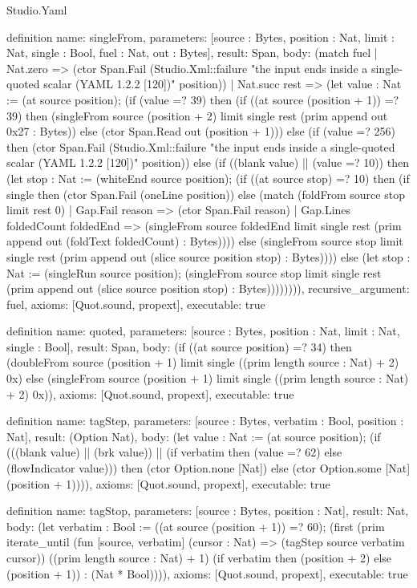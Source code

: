 \begin{lexlean}{Studio.Yaml}
\begin{semanticmodule}
definition{
  name: singleFrom,
  parameters: [source : Bytes, position : Nat, limit : Nat, single : Bool, fuel : Nat, out : Bytes],
  result: Span,
  body: (match fuel
    | Nat.zero => (ctor Span.Fail (Studio.Xml::failure "the input ends inside a single-quoted scalar (YAML 1.2.2 [120])" position))
    | Nat.succ rest => (let value : Nat := (at source position); (if (value =? 39) then (if ((at source (position + 1)) =? 39) then (singleFrom source (position + 2) limit single rest (prim append out 0x27 : Bytes)) else (ctor Span.Read out (position + 1))) else (if (value =? 256) then (ctor Span.Fail (Studio.Xml::failure "the input ends inside a single-quoted scalar (YAML 1.2.2 [120])" position)) else (if ((blank value) || (value =? 10)) then (let stop : Nat := (whiteEnd source position); (if ((at source stop) =? 10) then (if single then (ctor Span.Fail (oneLine position)) else (match (foldFrom source stop limit rest 0)
      | Gap.Fail reason => (ctor Span.Fail reason)
      | Gap.Lines foldedCount foldedEnd => (singleFrom source foldedEnd limit single rest (prim append out (foldText foldedCount) : Bytes)))) else (singleFrom source stop limit single rest (prim append out (slice source position stop) : Bytes)))) else (let stop : Nat := (singleRun source position); (singleFrom source stop limit single rest (prim append out (slice source position stop) : Bytes)))))))),
  recursive_argument: fuel,
  axioms: [Quot.sound, propext],
  executable: true
}

definition{
  name: quoted,
  parameters: [source : Bytes, position : Nat, limit : Nat, single : Bool],
  result: Span,
  body: (if ((at source position) =? 34) then (doubleFrom source (position + 1) limit single ((prim length source : Nat) + 2) 0x) else (singleFrom source (position + 1) limit single ((prim length source : Nat) + 2) 0x)),
  axioms: [Quot.sound, propext],
  executable: true
}

definition{
  name: tagStep,
  parameters: [source : Bytes, verbatim : Bool, position : Nat],
  result: (Option Nat),
  body: (let value : Nat := (at source position); (if (((blank value) || (brk value)) || (if verbatim then (value =? 62) else (flowIndicator value))) then (ctor Option.none [Nat]) else (ctor Option.some [Nat] (position + 1)))),
  axioms: [Quot.sound, propext],
  executable: true
}

definition{
  name: tagStop,
  parameters: [source : Bytes, position : Nat],
  result: Nat,
  body: (let verbatim : Bool := ((at source (position + 1)) =? 60); (first (prim iterate_until (fun [source, verbatim] (cursor : Nat) => (tagStep source verbatim cursor)) ((prim length source : Nat) + 1) (if verbatim then (position + 2) else (position + 1)) : (Nat * Bool)))),
  axioms: [Quot.sound, propext],
  executable: true
}


\end{semanticmodule}
\end{lexlean}
